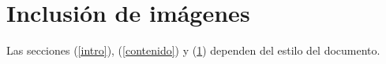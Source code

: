 \documentclass{article}
\begin{document}
\section{Inclusión de imágenes} \label{imagenes}




Las secciones (\ref{intro}), (\ref{contenido}) y (\ref{imagenes}) dependen del estilo del documento.



\end{document}
